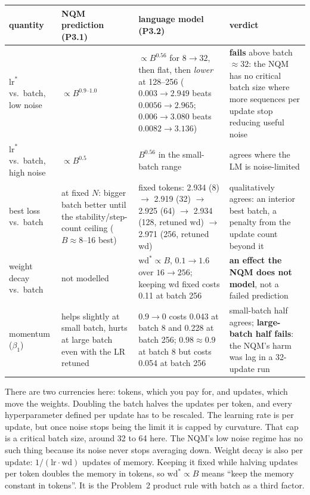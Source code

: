 \documentclass[10pt,letterpaper]{article}
\newcommand{\lrs}{\ensuremath{\mathrm{lr}^{*}}}
\newcommand{\wds}{\ensuremath{\mathrm{wd}^{*}}}
\begin{document}
\begin{table}[H]\small
\begin{tabularx}{\textwidth}{>{\raggedright\arraybackslash}p{2.1cm} L L L}\toprule
quantity & NQM prediction (P3.1) & language model (P3.2) & verdict\\\midrule
$\lrs$ vs.\ batch, low noise & $\propto B^{0.9\text{--}1.0}$ & $\propto B^{0.56}$ for $8\to32$, then flat, then \emph{lower} at 128--256 ($0.003\to2.949$ beats $0.0056\to2.965$; $0.006\to3.080$ beats $0.0082\to3.136$) & \textbf{fails} above batch $\approx32$: the NQM has no critical batch size where more sequences per update stop reducing useful noise\\
$\lrs$ vs.\ batch, high noise & $\propto B^{0.5}$ & $B^{0.56}$ in the small-batch range & agrees where the LM is noise-limited\\
best loss vs.\ batch & at fixed $N$: bigger batch better until the stability/step-count ceiling ($B\approx8$--16 best) & fixed tokens: 2.934 (8) $\to$ 2.919 (32) $\to$ 2.925 (64) $\to$ 2.934 (128, retuned wd) $\to$ 2.971 (256, retuned wd) & qualitatively agrees: an interior best batch, a penalty from the update count beyond it\\
weight decay vs.\ batch & not modelled & $\wds\propto B$, $0.1\to1.6$ over $16\to256$; keeping wd fixed costs 0.11 at batch 256 & \textbf{an effect the NQM does not model}, not a failed prediction\\
momentum ($\beta_1$) & helps slightly at small batch, hurts at large batch even with the LR retuned & $0.9\to0$ costs 0.043 at batch 8 and 0.228 at batch 256; $0.98\approx0.9$ at batch 8 but costs 0.054 at batch 256 & small-batch half agrees; \textbf{large-batch half fails}: the NQM's harm was lag in a 32-update run\\\bottomrule
\end{tabularx}
\end{table}

There are two currencies here: tokens, which you pay for, and updates, which move the weights. Doubling the batch halves the updates per token, and every hyperparameter defined per update has to be rescaled. The learning rate is per update, but once noise stops being the limit it is capped by curvature. That cap is a critical batch size, around 32 to 64 here. The NQM's low noise regime has no such thing because its noise never stops averaging down. Weight decay is also per update: $1/(\mathrm{lr}\cdot\mathrm{wd})$ updates of memory. Keeping it fixed while halving updates per token doubles the memory in tokens, so $\wds\propto B$ means ``keep the memory constant in tokens''. It is the Problem~2 product rule with batch as a third factor.
\end{document}
